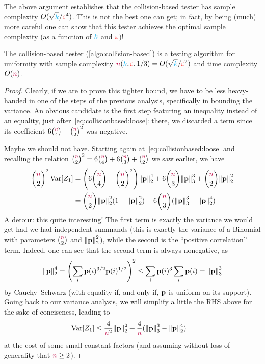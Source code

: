 The above argument establishes that the collision-based tester has sample complexity $O(\sqrt{{\textcolor{cyan}{k}}}/\textcolor{red}{\varepsilon}^4)$. This is not the best one can get; in fact, by being (much) more careful one can show that this tester achieves the optimal sample complexity (as a function of ${\textcolor{cyan}{k}}$ and $\textcolor{red}{\varepsilon}$)!
\begin{theorem}
The collision-based tester (\cref{algo:collision-based}) is a testing algorithm for uniformity with sample complexity ${\textcolor{purple}{n}}({\textcolor{cyan}{k}},\textcolor{red}{\varepsilon},1/3) = O(\sqrt{{\textcolor{cyan}{k}}}/\textcolor{red}{\varepsilon}^2)$ and time complexity $O({\textcolor{purple}{n}})$.
\end{theorem}
\begin{proof}
  Clearly, if we are to prove this tighter bound, we have to be less heavy-handed in one of the steps of the previous analysis, specifically in bounding the variance. An obvious candidate is the first step featuring an inequality instead of an equality, just after~\cref{eq:collisionbased:loose}: there, we discarded a term since its coefficient $6\binom{{\textcolor{purple}{n}}}{4} - \binom{{\textcolor{purple}{n}}}{2}^2$ was negative.
  
  Maybe we should not have. Starting again at~\cref{eq:collisionbased:loose} and recalling the relation
  $
    \binom{{\textcolor{purple}{n}}}{2}^2 = 6\binom{{\textcolor{purple}{n}}}{4} + 6\binom{{\textcolor{purple}{n}}}{3} + \binom{{\textcolor{purple}{n}}}{2}
  $ we saw earlier, we have 
  \begin{align}
  \binom{\ns}{2}^2\Var[Z_1]
   &= \Paren{6\binom{\ns}{4} - \binom{\ns}{2}^2}\normtwo{\p}^4+6\binom{\ns}{3}\norm{\p}_3^3+\binom{\ns}{2}\normtwo{\p}^2 \notag\\
   &= \binom{\ns}{2}\normtwo{\p}^2(1-\normtwo{\p}^2) + 6\binom{\ns}{3}(\norm{\p}_3^3-\normtwo{\p}^4)
  \end{align}
  A detour: this quite interesting! The first term is exactly the variance we would get had we had independent summands (this is exactly the variance of a Binomial with parameters $\binom{{\textcolor{purple}{n}}}{2}$ and $\normtwo{\p}^2$), while the second is the ``positive correlation'' term. Indeed, one can see that the second term is always nonegative, as
  \[
      \normtwo{\p}^4 %
      = \Paren{\sum_{i} \p(i)^{3/2} \p(i)^{1/2} }^2
      \leq \sum_{i} \p(i)^{3} \sum_{i}\p(i) = \norm{\p}_3^3
  \]
  by Cauchy--Schwarz (with equality if, and only if, $\mathbf{p}$ is uniform on its support). Going back to our variance analysis, we will simplify a little the RHS above for the sake of conciseness, leading to
  \begin{align}
    \label{eq:good:variance}
  \Var[Z_1]
   &\leq \frac{4}{\ns^2}\normtwo{\p}^2 + \frac{4}{\ns}(\norm{\p}_3^3-\normtwo{\p}^4)
  \end{align}
  at the cost of some small constant factors (and assuming without loss of generality that ${\textcolor{purple}{n}} \geq 2$).
  

\end{proof}
